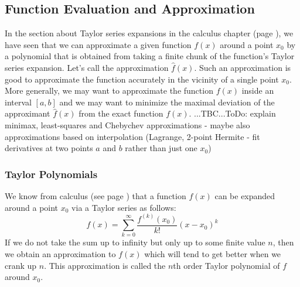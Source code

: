 

\subsection{Function Evaluation and Approximation}
In the section about Taylor series expansions in the calculus chapter (page \pageref{Sec:TaylorSeries}), we have seen that we can approximate a given function $f(x)$ around a point $x_0$ by a polynomial that is obtained from taking a finite chunk of the function's Taylor series expansion. Let's call the approximation $\hat{f}(x)$. Such an approximation is good to approximate the function accurately in the vicinity of a single point $x_0$. More generally, we may want to approximate the function $f(x)$ inside an interval $[a,b]$ and we may want to minimize the maximal deviation of the approximant  $\hat{f}(x)$ from the exact function $f(x)$. ...TBC...ToDo: explain minimax, least-squares and Chebychev approximations - maybe also approximations based on interpolation (Lagrange, 2-point Hermite - fit derivatives at two points $a$ and $b$ rather than just one $x_0$)



\subsubsection{Taylor Polynomials}
We know from calculus (see page \pageref{Eq:TaylorSeries}) that a function $f(x)$ can be expanded around a point $x_0$ via a Taylor series as follows:
\begin{equation}
f(x) = \sum_{k=0}^\infty \frac{f^{(k)}(x_0)}{k!} (x-x_0)^k
\end{equation}
If we do not take the sum up to infinity but only up to some finite value $n$, then we obtain an approximation to $f(x)$ which will tend to get better when we crank up $n$. This approximation is called the $n$th order Taylor polynomial of $f$ around $x_0$. 




